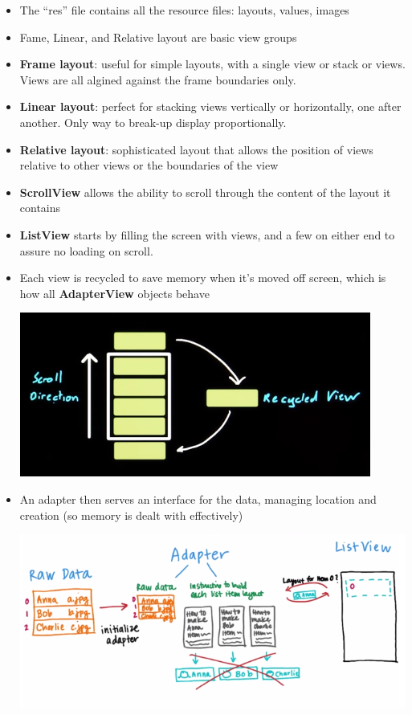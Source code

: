 \begin{itemize}[--]
	\item The ``res'' file contains all the resource files: layouts, values, images
	\item Fame, Linear, and Relative layout are basic view groups
	\item \textbf{Frame layout}: useful for simple layouts, with a single view or stack or views. Views are all algined against the frame boundaries only.
	\item \textbf{Linear layout}: perfect for stacking views vertically or horizontally, one after another. Only way to break-up display proportionally.
	\item \textbf{Relative layout}: sophisticated layout that allows the position of views relative to other views or the boundaries of the view
	\item \textbf{ScrollView} allows the ability to scroll through the content of the layout it contains
	\item \textbf{ListView} starts by filling the screen with views, and a few on either end to assure no loading on scroll.
	\item Each view is recycled to save memory when it's moved off screen, which is how all \textbf{AdapterView} objects behave
	\begin{center}
		\includegraphics[scale=0.7]{sections/1/recycle.png}
	\end{center}

	\item An adapter then serves an interface for the data, managing location and creation (so memory is dealt with effectively)
	\begin{center}
		\includegraphics[scale=0.6]{sections/1/adapter.png}
	\end{center}


\end{itemize}
